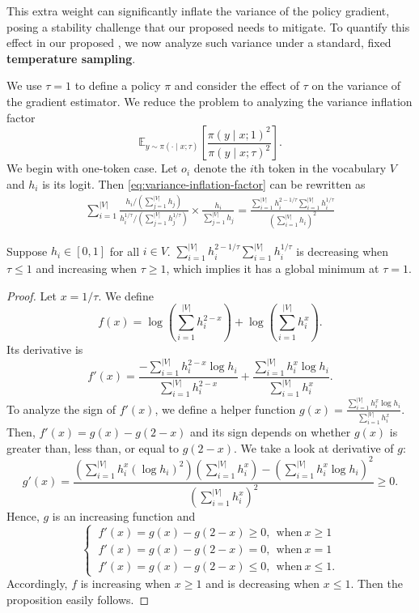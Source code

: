 This extra weight can significantly inflate the variance of the policy gradient, posing a stability challenge that our proposed \alg needs to mitigate.
To quantify this effect in our proposed \alg, we now analyze such variance under a standard, fixed \textbf{temperature sampling}.

We use $\tau=1$ to define a policy $\pi$ and consider the effect of $\tau$ on the variance of the gradient estimator. We reduce the problem to analyzing the variance inflation factor
\begin{equation}
\label{eq:variance-inflation-factor}
\mathbb{E}_{y\sim\pi(\cdot\mid x;\tau)}\left[\frac{\pi(y\mid x;1)^2}{\pi(y\mid x;\tau)^2}\right].
\end{equation}
We begin with one-token case. Let $o_i$ denote the $i$th token in the vocabulary $V$ and $h_i$ is its logit. Then \eqref{eq:variance-inflation-factor} can be rewritten as
\begin{align*}
    \sum_{i=1}^{|V|}\frac{h_i/(\sum_{j=1}^{|V|} h_j)}{h^{1/\tau}_i/(\sum_{j=1}^{|V|} h^{1/\tau}_j)}\times\frac{h_i}{\sum_{j=1}^{|V|} h_j}
    = \frac{\sum_{i=1}^{|V|} h_i^{2-1/\tau}\sum_{i=1}^{|V|} h^{1/\tau}_i}{\left(\sum_{i=1}^{|V|} h_i\right)^2}
\end{align*}

\begin{proposition}
Suppose $h_i\in[0,1]$ for all $i\in V$.
$\sum_{i=1}^{|V|} h_i^{2-1/\tau}\sum_{i=1}^{|V|} h^{1/\tau}_i$ is decreasing when $\tau\le1$ and increasing when $\tau\ge1$, which implies it has a global minimum at $\tau=1$.
\end{proposition}
\begin{proof}
Let $x=1/\tau$. We define 
\[
f(x)=\log\left(\sum_{i=1}^{|V|} h_i^{2-x}\right)+\log\left(\sum_{i=1}^{|V|} h^{x}_i\right).
\]
Its derivative is
\[
f'(x)=\frac{-\sum_{i=1}^{|V|} h_i^{2-x}\log h_i}{\sum_{i=1}^{|V|} h_i^{2-x}}
+\frac{\sum_{i=1}^{|V|} h_i^{x}\log h_i}{\sum_{i=1}^{|V|} h_i^{x}}.
\]
To analyze the sign of $f'(x)$, we define a helper function $g(x) = \frac{\sum_{i=1}^{|V|} h_i^{x}\log h_i}{\sum_{i=1}^{|V|} h_i^{x}}$. Then, $f'(x)=g(x)-g(2-x)$ and its sign depends on whether $g(x)$ is greater than, less than, or equal to $g(2-x)$. We take a look at derivative of $g$:
\[
g'(x) = \frac{\left(\sum_{i=1}^{|V|} h_i^{x}(\log h_i)^2\right) \left(\sum_{i=1}^{|V|} h_i^{x}\right) - \left(\sum_{i=1}^{|V|} h_i^{x}\log h_i\right)^2}{\left(\sum_{i=1}^{|V|} h_i^{x}\right)^2}\ge0.
\]
Hence, $g$ is an increasing function and
\begin{equation*}
\begin{cases}
~f'(x)=g(x)-g(2-x)\ge0,~~\mathrm{when}~x\ge1\\
~f'(x)=g(x)-g(2-x)=0,~~\mathrm{when}~x=1\\
~f'(x)=g(x)-g(2-x)\le0,~~\mathrm{when}~x\le1.
\end{cases}
\end{equation*}
Accordingly, $f$ is increasing when $x\ge1$ and is decreasing when $x\le1$. Then the proposition easily follows.
\end{proof}

